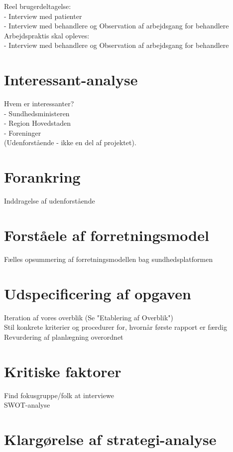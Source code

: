 \documentclass{article}
\begin{document}
Reel brugerdeltagelse:\\ 
- Interview med patienter\\
- Interview med behandlere og Observation af arbejdsgang for behandlere
\\
Arbejdspraktis skal opleves:\\
- Interview med behandlere og Observation af arbejdsgang for behandlere

\section{Interessant-analyse}

Hvem er interessanter?\\
- Sundhedsministeren\\
- Region Hovedstaden\\
- Foreninger\\
(Udenforstående - ikke en del af projektet).

\section{Forankring}

Inddragelse af udenforstående

\section{Forståele af forretningsmodel}

Fælles opsummering af forretningsmodellen bag sundhedsplatformen

\section{Udspecificering af opgaven}

Iteration af vores overblik (Se "Etablering af Overblik")
\\
Stil konkrete kriterier og procedurer for, hvornår første rapport er færdig
\\
Revurdering af planlægning overordnet

\section{Kritiske faktorer}

Find fokusgruppe/folk at interviewe
\\
SWOT-analyse

\section{Klargørelse af strategi-analyse}
\end{document}

